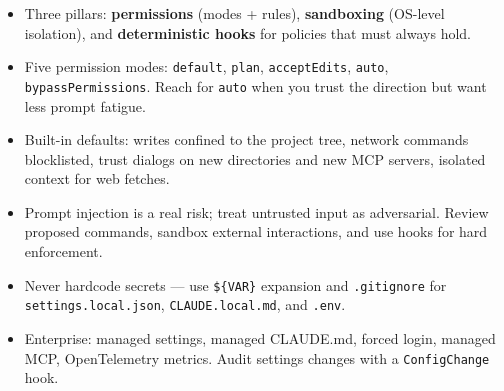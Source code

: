 \begin{summarybox}
\begin{itemize}
  \item Three pillars: \textbf{permissions} (modes + rules),
        \textbf{sandboxing} (OS-level isolation), and
        \textbf{deterministic hooks} for policies that must always hold.
  \item Five permission modes: \texttt{default}, \texttt{plan},
        \texttt{acceptEdits}, \texttt{auto}, \texttt{bypassPermissions}.
        Reach for \texttt{auto} when you trust the direction but want
        less prompt fatigue.
  \item Built-in defaults: writes confined to the project tree, network
        commands blocklisted, trust dialogs on new directories and new
        MCP servers, isolated context for web fetches.
  \item Prompt injection is a real risk; treat untrusted input as
        adversarial. Review proposed commands, sandbox external
        interactions, and use hooks for hard enforcement.
  \item Never hardcode secrets — use \texttt{\$\{VAR\}} expansion and
        \texttt{.gitignore} for \texttt{settings.local.json},
        \texttt{CLAUDE.local.md}, and \texttt{.env}.
  \item Enterprise: managed settings, managed CLAUDE.md, forced login,
        managed MCP, OpenTelemetry metrics. Audit settings changes with
        a \texttt{ConfigChange} hook.
\end{itemize}
\end{summarybox}

\nocite{*}
\printbibliography[heading=subbibliography,title={References}]
